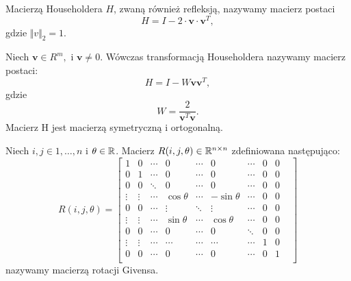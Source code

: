 \documentclass[notheorems]{beamer}
\newcommand{\vr}[1]{\mathbf{#1}}
\newcommand{\mx}[1]{{#1}}
\begin{document}
\begin{frame}
\begin{definition}
Macierzą Householdera $H$, zwaną również refleksją, nazywamy macierz postaci 
$$
\mx{H}=\mx{I}-2\cdot \vr{v}\cdot \vr{v}^{T},
$$
gdzie $\Vert v \Vert_{2} = 1$.
\end{definition}
\end{frame}

\begin{frame}
\begin{theorem} 
Niech  $\vr{v}\in R^{m}, $ i $\vr{v}\neq 0. $ Wówczas transformacją Householdera nazywamy macierz postaci:
$$
\mx{H}=\mx{I}-W\vr{v}\vr{v}^{T},
$$
gdzie
$$
W={\frac {2}{\vr{v}^{T}\vr{v}}}.
$$ 
Macierz H jest macierzą symetryczną i ortogonalną.
\end{theorem}
\end{frame}

\begin{frame}
\begin{definition}
Niech $ i,j \in {1, \ldots, n}$ i $\theta \in \mathbb{R}$. Macierz $\mx{R}(i,j,\theta) \in \setR^{n\times n}$ zdefiniowana następująco:
$$
\mx{R}(i,j,\theta) = \begin{bmatrix}
1       & 0     & \cdots &    0       & \cdots &    0       & \cdots & 0 & 0& \\
0       & 1     & \cdots &     0      & \cdots &     0      &  \cdots& 0 & 0 &   \\
0       & 0     & \ddots &     0      &  \cdots&     0      &  \cdots& 0 & 0 &  \\
\vdots  &\vdots &  \cdots& \cos\theta & \cdots & -\sin\theta&  \cdots& 0 & 0& \\
0       &  0    & \cdots & \vdots     &  \ddots&  \vdots    & \cdots & 0 & 0& \\
\vdots  & \vdots& \cdots & \sin\theta & \cdots & \cos\theta &  \cdots& 0 & 0& \\
0       & 0     & \cdots &    0       &  \cdots&  0         & \ddots &  0& 0& \\
\vdots  & \vdots&\cdots  &  \cdots    &  \cdots&  \cdots    & \cdots & 1 & 0&\\
0       & 0     & \cdots &     0      &  \cdots&    0       &  \cdots& 0 & 1 & \\       
\end{bmatrix}
$$
nazywamy macierzą rotacji Givensa.
\end{definition}
\end{frame}
\end{document}
